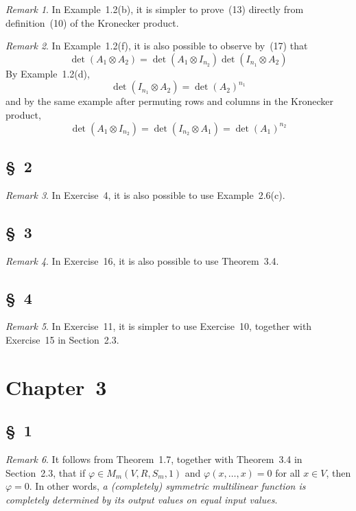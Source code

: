 \documentclass[letterpaper,12pt]{article}
\newcommand{\tprod}{\otimes}
\theoremstyle{definition}
\theoremstyle{remark}
\newtheorem*{rmk}{Remark}
\begin{document}
\begin{rmk}
In Example~1.2(b), it is simpler to prove~(13) directly from definition~(10) of the Kronecker product.
\end{rmk}

\begin{rmk}
In Example~1.2(f), it is also possible to observe by~(17) that
\[\det(A_1\tprod A_2)=\det(A_1\tprod I_{n_2})\det(I_{n_1}\tprod A_2)\]
By Example~1.2(d),
\[\det(I_{n_1}\tprod A_2)=\det(A_2)^{n_1}\]
and by the same example after permuting rows and columns in the Kronecker product,
\[\det(A_1\tprod I_{n_2})=\det(I_{n_2}\tprod A_1)=\det(A_1)^{n_2}\]
\end{rmk}

\subsection*{\S~2}
\begin{rmk}
In Exercise~4, it is also possible to use Example~2.6(c).
\end{rmk}

\subsection*{\S~3}
\begin{rmk}
In Exercise~16, it is also possible to use Theorem~3.4.
\end{rmk}

\subsection*{\S~4}
\begin{rmk}
In Exercise~11, it is simpler to use Exercise~10, together with Exercise~15 in Section~2.3.
\end{rmk}

\newpage
\section*{Chapter~3}
\subsection*{\S~1}
\begin{rmk}
It follows from Theorem~1.7, together with Theorem~3.4 in Section~2.3, that if \(\varphi\in M_m(V,R,S_m,1)\) and \(\varphi(x,\ldots,x)=0\) for all \(x\in V\), then \(\varphi=0\). In other words, \emph{a (completely) symmetric multilinear function is completely determined by its output values on equal input values}.
\end{rmk}
\end{document}
